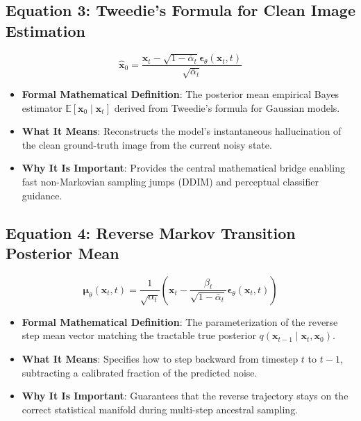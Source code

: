 \documentclass[11pt,a4paper]{article}
\theoremstyle{definition}
\begin{document}
\subsection{\textbf{Equation 3: Tweedie's Formula for Clean Image Estimation}}
{\boldmath
\begin{equation}
\hat{\mathbf{x}}_0 = \frac{\mathbf{x}_t - \sqrt{1 - \bar{\alpha}_t} \boldsymbol{\epsilon}_\theta(\mathbf{x}_t, t)}{\sqrt{\bar{\alpha}_t}}
\end{equation}
}
\begin{itemize}
    \item \textbf{Formal Mathematical Definition}:
    The posterior mean empirical Bayes estimator $\mathbb{E}[\mathbf{x}_0 \mid \mathbf{x}_t]$ derived from Tweedie's formula for Gaussian models.
    \item \textbf{What It Means}:
    Reconstructs the model's instantaneous hallucination of the clean ground-truth image from the current noisy state.
    \item \textbf{Why It Is Important}:
    Provides the central mathematical bridge enabling fast non-Markovian sampling jumps (DDIM) and perceptual classifier guidance.
\end{itemize}

\subsection{\textbf{Equation 4: Reverse Markov Transition Posterior Mean}}
{\boldmath
\begin{equation}
\boldsymbol{\mu}_\theta(\mathbf{x}_t, t) = \frac{1}{\sqrt{\alpha_t}} \left( \mathbf{x}_t - \frac{\beta_t}{\sqrt{1 - \bar{\alpha}_t}} \boldsymbol{\epsilon}_\theta(\mathbf{x}_t, t) \right)
\end{equation}
}
\begin{itemize}
    \item \textbf{Formal Mathematical Definition}:
    The parameterization of the reverse step mean vector matching the tractable true posterior $q(\mathbf{x}_{t-1} \mid \mathbf{x}_t, \mathbf{x}_0)$.
    \item \textbf{What It Means}:
    Specifies how to step backward from timestep $t$ to $t - 1$, subtracting a calibrated fraction of the predicted noise.
    \item \textbf{Why It Is Important}:
    Guarantees that the reverse trajectory stays on the correct statistical manifold during multi-step ancestral sampling.
\end{itemize}
\end{document}
